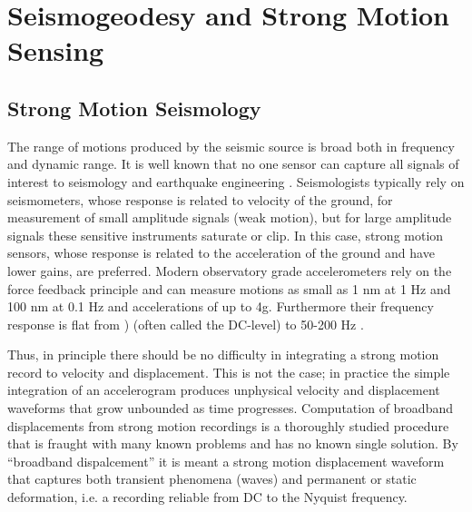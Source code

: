 
\chapter{Seismogeodesy and Strong Motion Sensing}

\section{Strong Motion Seismology}
The range of motions produced by the seismic source is broad both in frequency and dynamic range. It is well known that no one sensor can capture all signals of interest to seismology and earthquake engineering \cite{Havskov2006}. Seismologists typically rely on seismometers, whose response is related to velocity of the ground, for measurement of small amplitude signals (weak motion), but for large amplitude signals these sensitive instruments saturate or clip. In this case, strong motion sensors, whose response is related to the acceleration of the ground and have lower gains, are preferred. Modern observatory grade accelerometers rely on the force feedback principle and can measure motions as small as 1 nm at 1 Hz and 100 nm at 0.1 Hz and accelerations of up to 4g. Furthermore their frequency response is flat from ) (often called the DC-level) to 50-200 Hz \cite{Havskov2006}.

Thus, in principle there should be no difficulty in integrating a strong motion record to velocity and displacement. This is not the case; in practice the simple integration of an accelerogram produces unphysical velocity and displacement waveforms that grow unbounded as time progresses. Computation of broadband displacements from strong motion recordings is a thoroughly studied procedure that is fraught with many known problems and has no known single solution. By ``broadband dispalcement'' it is meant a strong motion displacement waveform that captures both transient phenomena (waves) and permanent or static deformation, i.e. a recording reliable from DC to the Nyquist frequency.

